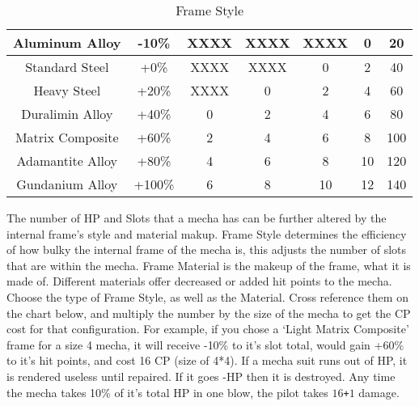 \documentclass[twoside]{book}
\begin{document}
\begin{enumerate}
\begin{table}[htb]
\begin{center}
\begin{tabular}{|c|c|c|c|c|c|c|}
 Aluminum Alloy & -10\% & XXXX & XXXX & XXXX & 0 & 20 \\

\hline

 Standard Steel & +0\% & XXXX & XXXX & 0 & 2 & 40 \\

\hline

 Heavy Steel & +20\% & XXXX & 0 & 2 & 4 & 60 \\

\hline

 Duralimin Alloy & +40\% & 0 & 2 & 4 & 6 & 80 \\

\hline

 Matrix Composite & +60\% & 2 & 4 & 6 & 8 & 100 \\

\hline

 Adamantite Alloy & +80\% & 4 & 6 & 8 & 10 & 120 \\

\hline

 Gundanium Alloy & +100\% & 6 & 8 & 10 & 12 & 140 \\

\hline


  \end{tabular}
  
\caption{Frame Style}
  
  \end{center}
\end{table}
    
                    The number of HP and Slots that a mecha has can
                   be further altered by the internal frame's style
                   and material makup. Frame Style determines the
                   efficiency of how bulky the internal frame of the
                   mecha is, this adjusts the number of slots that are
                   within the mecha. Frame Material is the makeup of the
                   frame, what it is made of. Different materials offer
                   decreased or added hit points to the mecha. Choose the
                   type of Frame Style, as well as the Material. Cross
                   reference them on the chart below, and multiply the
                   number by the size of the mecha to get the CP cost for
                   that configuration. 
                    For example, if you chose a `Light Matrix
                   Composite' frame for a size 4 mecha, it will
                   receive -10\% to it's slot total, would gain +60\%
                   to it's hit points, and cost 16 CP (size of
                   4*4). 
                    If a mecha suit runs out of HP, it is rendered
                   useless until repaired. If it goes -HP then it is
                   destroyed. Any time the mecha takes 10\% of it's
                   total HP in one blow, the pilot takes \ensuremath{1}\ensuremath{6}\texttt{+}\ensuremath{1} damage.
                   

\end{enumerate}
\end{document}
